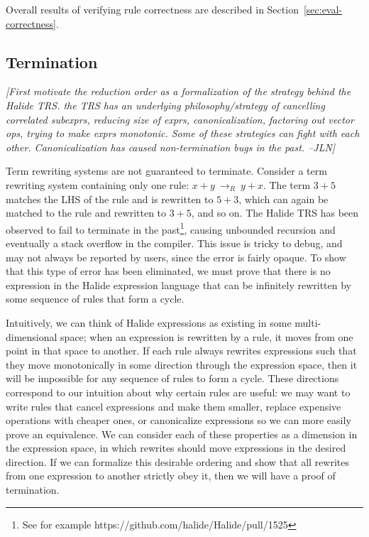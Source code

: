 \documentclass[acmsmall,review]{acmart}\settopmatter{printfolios=true,printccs=false,printacmref=false}
\newcommand{\jln}[1]{\textcolor{uwpurple}{\textit{[{#1} --JLN]}}}
\newcommand{\rewrites}[0]{\:\rightarrow_{R}\:}
\begin{document}
Overall results of verifying rule correctness are described in Section~\ref{sec:eval-correctness}.

\subsection{Termination}
\label{sub:termination}

\jln{First motivate the reduction order as a formalization of the strategy behind the Halide TRS. the TRS has an underlying 
philosophy/strategy of cancelling correlated subexprs, reducing size of exprs, canonicalization, 
factoring out vector ops, trying to make exprs monotonic. Some of these strategies can 
fight with each other. Canonicalization has caused non-termination bugs in the past. }

Term rewriting systems are not guaranteed to terminate. Consider a term
rewriting system containing only one rule: $x + y \rewrites y + x$. The term
$3 + 5$ matches the LHS of the rule and is rewritten to $5 + 3$, which can again
be matched to the rule and rewritten to $3 + 5$, and so on. The Halide TRS has been observed to fail to terminate in the past\footnote{See for example https://github.com/halide/Halide/pull/1525}, causing unbounded recursion and eventually a stack overflow in the compiler. This issue is tricky to debug, and may not always be reported by users, since the error is fairly opaque. To show that this type of error has been eliminated, we must prove that there is no expression in the Halide expression language that can be infinitely rewritten by some sequence of rules that form a cycle.

Intuitively, we can think of Halide expressions as existing in some multi-dimensional space; when an expression is rewritten by a rule, it moves from one point in that space to another. If each rule always rewrites expressions such that they move monotonically in some direction through the expression space, then it will be impossible for any sequence of rules to form a cycle. These directions correspond to our intuition about why certain rules are useful: we may want to write rules that cancel expressions and make them smaller, replace expensive operations with cheaper ones, or canonicalize expressions so we can more easily prove an equivalence. We can consider each of these properties as a dimension in the expression space, in which rewrites should move expressions in the desired direction. If we can formalize this desirable ordering and show that all rewrites from one expression to another strictly obey it, then we will have a proof of termination.
\end{document}

